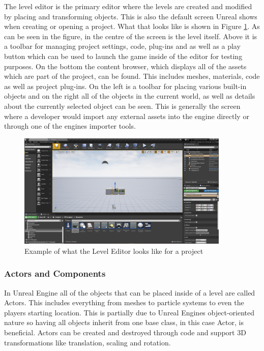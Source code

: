 The level editor is the primary editor where the levels are created and modified by placing and transforming objects. This is also the default screen Unreal shows when creating or opening a project. What that looks like is shown in Figure \ref{fig:LevelEditor}. As can be seen in the figure, in the centre of the screen is the level itself. Above it is a toolbar for managing project settings, code, plug-ins and as well as a play button which can be used to launch the game inside of the editor for testing purposes. On the bottom the content browser, which displays all of the assets which are part of the project, can be found. This includes meshes, materials, code as well as project plug-ins. On the left is a toolbar for placing various built-in objects and on the right all of the objects in the current world, as well as details about the currently selected object can be seen. This is generally the screen where a developer would import any external assets into the engine directly or through one of the engines importer tools.\\

\begin{figure}[htpb]
	\centering
	\includegraphics[width=0.9\textwidth]{fig/UnrealEngineLevelEditor.png}
	\caption[Unreal Engine Level Editor]{Example of what the Level Editor looks like for a project \protect}
	\label{fig:LevelEditor}
\end{figure}

\subsubsection{Actors and Components}

In Unreal Engine all of the objects that can be placed inside of a level are called Actors\cite{bib:UEActors}. This includes everything from meshes to particle systems to even the players starting location. This is partially due to Unreal Engines object-oriented nature so having all objects inherit from one base class, in this case Actor, is beneficial. Actors can be created and destroyed through code and support 3D transformations like translation, scaling and rotation.\\

